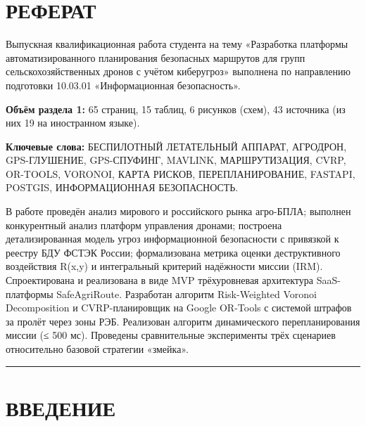 \hypertarget{ux440ux435ux444ux435ux440ux430ux442}{%
\section{РЕФЕРАТ}\label{ux440ux435ux444ux435ux440ux430ux442}}

Выпускная квалификационная работа студента на тему «Разработка платформы автоматизированного планирования безопасных маршрутов для групп сельскохозяйственных дронов с учётом киберугроз» выполнена по направлению подготовки 10.03.01 «Информационная безопасность».

\textbf{Объём раздела 1:} 65 страниц, 15 таблиц, 6 рисунков (схем), 43 источника (из них 19 на иностранном языке).

\textbf{Ключевые слова:} БЕСПИЛОТНЫЙ ЛЕТАТЕЛЬНЫЙ АППАРАТ, АГРОДРОН, GPS-ГЛУШЕНИЕ, GPS-СПУФИНГ, MAVLINK, МАРШРУТИЗАЦИЯ, CVRP, OR-TOOLS, VORONOI, КАРТА РИСКОВ, ПЕРЕПЛАНИРОВАНИЕ, FASTAPI, POSTGIS, ИНФОРМАЦИОННАЯ БЕЗОПАСНОСТЬ.

В работе проведён анализ мирового и российского рынка агро-БПЛА; выполнен конкурентный анализ платформ управления дронами; построена детализированная модель угроз информационной безопасности с привязкой к реестру БДУ ФСТЭК России; формализована метрика оценки деструктивного воздействия R(x,y) и интегральный критерий надёжности миссии (IRM). Спроектирована и реализована в виде MVP трёхуровневая архитектура SaaS-платформы SafeAgriRoute. Разработан алгоритм Risk-Weighted Voronoi Decomposition и CVRP-планировщик на Google OR-Tools с системой штрафов за пролёт через зоны РЭБ. Реализован алгоритм динамического перепланирования миссии (≤ 500 мс). Проведены сравнительные эксперименты трёх сценариев относительно базовой стратегии «змейка».

\begin{center}\rule{0.5\linewidth}{0.5pt}\end{center}

\hypertarget{ux432ux432ux435ux434ux435ux43dux438ux435}{%
\section{ВВЕДЕНИЕ}\label{ux432ux432ux435ux434ux435ux43dux438ux435}}

